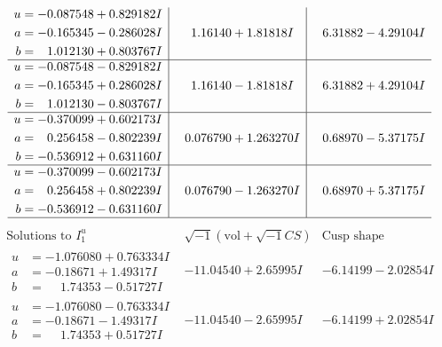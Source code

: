 \documentclass[1p]{elsarticle_modified}
\theoremstyle{definition}
\newcommand{\I}{\sqrt{-1}}
\begin{document}
$$\begin{array}{c|c|c}
\begin{aligned}
u &= -0.087548 + 0.829182 I \\
a &= -0.165345 - 0.286028 I \\
b &= \phantom{-}1.012130 + 0.803767 I\end{aligned}
 & \phantom{-}1.16140 + 1.81818 I & \phantom{-}6.31882 - 4.29104 I \\ \hline\begin{aligned}
u &= -0.087548 - 0.829182 I \\
a &= -0.165345 + 0.286028 I \\
b &= \phantom{-}1.012130 - 0.803767 I\end{aligned}
 & \phantom{-}1.16140 - 1.81818 I & \phantom{-}6.31882 + 4.29104 I \\ \hline\begin{aligned}
u &= -0.370099 + 0.602173 I \\
a &= \phantom{-}0.256458 - 0.802239 I \\
b &= -0.536912 + 0.631160 I\end{aligned}
 & \phantom{-}0.076790 + 1.263270 I & \phantom{-}0.68970 - 5.37175 I \\ \hline\begin{aligned}
u &= -0.370099 - 0.602173 I \\
a &= \phantom{-}0.256458 + 0.802239 I \\
b &= -0.536912 - 0.631160 I\end{aligned}
 & \phantom{-}0.076790 - 1.263270 I & \phantom{-}0.68970 + 5.37175 I\\
 \hline 
 \end{array}$$\newpage$$\begin{array}{c|c|c}  
\text{Solutions to }I^u_{1}& \I (\text{vol} + \sqrt{-1}CS) & \text{Cusp shape}\\
 \hline 
\begin{aligned}
u &= -1.076080 + 0.763334 I \\
a &= -0.18671 + 1.49317 I \\
b &= \phantom{-}1.74353 - 0.51727 I\end{aligned}
 & -11.04540 + 2.65995 I & -6.14199 - 2.02854 I \\ \hline\begin{aligned}
u &= -1.076080 - 0.763334 I \\
a &= -0.18671 - 1.49317 I \\
b &= \phantom{-}1.74353 + 0.51727 I\end{aligned}
 & -11.04540 - 2.65995 I & -6.14199 + 2.02854 I \\ \hline\begin{aligned}

\end{aligned}
\end{array}$$
\end{document}
